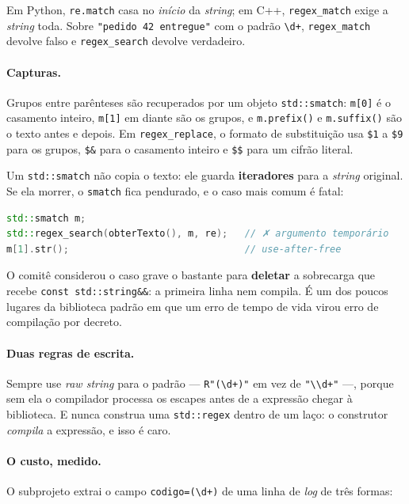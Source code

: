 Em Python, \texttt{re.match} casa no \emph{início} da \emph{string}; em C++,
\texttt{regex\_match} exige a \emph{string} toda. Sobre
\texttt{"pedido 42 entregue"} com o padrão \texttt{\textbackslash d+},
\texttt{regex\_match} devolve falso e \texttt{regex\_search} devolve verdadeiro.

\paragraph{Capturas.} Grupos entre parênteses são recuperados por um objeto
\texttt{std::smatch}: \texttt{m[0]} é o casamento inteiro, \texttt{m[1]} em
diante são os grupos, e \texttt{m.prefix()} e \texttt{m.suffix()} são o texto
antes e depois. Em \texttt{regex\_replace}, o formato de substituição usa
\texttt{\$1} a \texttt{\$9} para os grupos, \texttt{\$\&} para o casamento
inteiro e \texttt{\$\$} para um cifrão literal.

\begin{armadilha}
Um \texttt{std::smatch} não copia o texto: ele guarda \textbf{iteradores} para a
\emph{string} original. Se ela morrer, o \texttt{smatch} fica pendurado, e o
caso mais comum é fatal:
\begin{lstlisting}[style=bt, language=C++, frame=none,
                   xleftmargin=0pt, xrightmargin=0pt]
std::smatch m;
std::regex_search(obterTexto(), m, re);   // ✗ argumento temporário
m[1].str();                               // use-after-free
\end{lstlisting}
O comitê considerou o caso grave o bastante para \textbf{deletar} a sobrecarga
que recebe \texttt{const std::string\&\&}: a primeira linha nem compila. É um
dos poucos lugares da biblioteca padrão em que um erro de tempo de vida virou
erro de compilação por decreto.
\end{armadilha}

\paragraph{Duas regras de escrita.} Sempre use \emph{raw string} para o padrão
--- \texttt{R"(\textbackslash d+)"} em vez de
\texttt{"\textbackslash\textbackslash d+"} ---, porque sem ela o compilador
processa os escapes antes de a expressão chegar à biblioteca. E nunca construa
uma \texttt{std::regex} dentro de um laço: o construtor \emph{compila} a
expressão, e isso é caro.

\paragraph{O custo, medido.} O subprojeto extrai o campo
\texttt{codigo=(\textbackslash d+)} de uma linha de \emph{log} de três formas:

